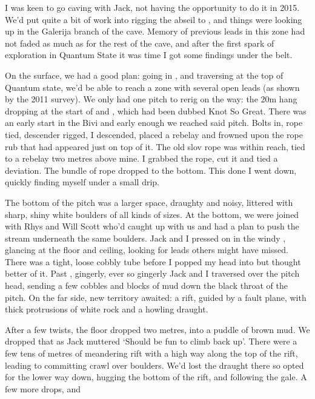 I was keen to go caving with Jack, not having the opportunity to do it in 2015. We'd put quite a bit of work into rigging the abseil to , and things were looking up in the Galerija branch of the cave. Memory of previous leads in this zone had not faded as much as for the rest of the cave, and after the first spark of exploration in Quantum State it was time I got some findings under the belt.

On the surface, we had a good plan: going in , and traversing at the top of Quantum state, we'd be able to reach a zone with several open leads (as shown by the 2011 survey). We only had one pitch to rerig on the way: the 20m hang dropping at the start of  and , which had been dubbed Knot So Great. There was an early start in the Bivi and early enough we reached said pitch. Bolts in, rope tied, descender rigged, I descended, placed a rebelay and frowned upon the rope rub that had appeared just on top of it. The old slov rope was within reach, tied to a rebelay two metres above mine. I grabbed the rope, cut it and tied a deviation. The bundle of rope dropped to the bottom. This done I went down, quickly finding myself under a small drip. 

The bottom of the pitch was a larger space, draughty and noisy, littered with sharp, shiny white boulders of all kinds of sizes. At the bottom, we were joined with Rhys and Will Scott who'd caught up with us and had a plan to push the stream underneath the same boulders. Jack and I pressed on in the windy , glancing at the floor and ceiling, looking for leads others might have missed. There was a tight, loose cobbly tube before  I popped my head into but thought better of it. Past , gingerly, ever so gingerly Jack and I traversed over the pitch head, sending a few cobbles and blocks of mud down the black throat of the pitch. On the far side, new territory awaited: a rift, guided by a fault plane, with thick protrusions of white rock and a howling draught.

After a few twists, the floor dropped two metres, into a puddle of brown mud. We dropped that as Jack muttered `Should be fun to climb back up'. There were a few tens of metres of meandering rift with a high way along the top of the rift, leading to committing crawl over boulders. We'd lost the draught there so opted for the lower way down, hugging the bottom of the rift, and following the gale. A few more drops, and 

